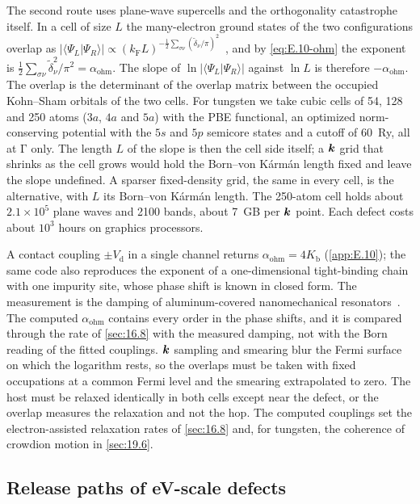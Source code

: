 The second route uses plane-wave supercells and the orthogonality catastrophe itself. In a cell of size $L$ the many-electron ground states of the two configurations overlap as $|\langle\Psi_L|\Psi_R\rangle| \propto (k_{\mathrm{F}}L)^{-\frac12\sum_{\sigma\nu}(\tilde\delta_\nu/\pi)^2}$~\cite{anderson1967infrared}, and by \cref{eq:E.10-ohm} the exponent is $\tfrac12\sum_{\sigma\nu}\tilde\delta_\nu^2/\pi^2 = \alpha_{\mathrm{ohm}}$. The slope of $\ln|\langle\Psi_L|\Psi_R\rangle|$ against $\ln L$ is therefore $-\alpha_{\mathrm{ohm}}$. The overlap is the determinant of the overlap matrix between the occupied Kohn--Sham orbitals of the two cells. For tungsten we take cubic cells of 54, 128 and 250 atoms ($3a$, $4a$ and $5a$) with the PBE functional, an optimized norm-conserving potential with the $5s$ and $5p$ semicore states and a cutoff of \SI{60}{Ry}, all at $\mathrm{\Gamma}$ only. The length $L$ of the slope is then the cell side itself; a $\bm{k}$ grid that shrinks as the cell grows would hold the Born--von K\'arm\'an length fixed and leave the slope undefined. A sparser fixed-density grid, the same in every cell, is the alternative, with $L$ its Born--von K\'arm\'an length. The 250-atom cell holds about $2.1\times10^5$ plane waves and 2100 bands, about \SI{7}{GB} per $\bm{k}$ point. Each defect costs about $10^3$ hours on graphics processors.

A contact coupling $\pm V_{\mathrm{d}}$ in a single channel returns $\alpha_{\mathrm{ohm}} = 4K_{\mathrm{b}}$ (\cref{app:E.10}); the same code also reproduces the exponent of a one-dimensional tight-binding chain with one impurity site, whose phase shift is known in closed form. The measurement is the damping of aluminum-covered nanomechanical resonators~\cite{maillet2023nanomechanical}. The computed $\alpha_{\mathrm{ohm}}$ contains every order in the phase shifts, and it is compared through the rate of \cref{sec:16.8} with the measured damping, not with the Born reading of the fitted couplings. $\bm{k}$ sampling and smearing blur the Fermi surface on which the logarithm rests, so the overlaps must be taken with fixed occupations at a common Fermi level and the smearing extrapolated to zero. The host must be relaxed identically in both cells except near the defect, or the overlap measures the relaxation and not the hop. The computed couplings set the electron-assisted relaxation rates of \cref{sec:16.8} and, for tungsten, the coherence of crowdion motion in \cref{sec:19.6}.

\subsection{Release paths of eV-scale defects}

